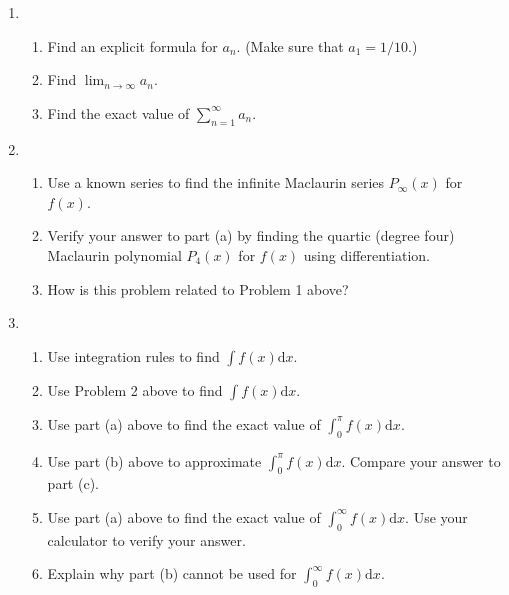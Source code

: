 \documentclass[12pt]{article}
\begin{document}
\begin{enumerate}
  
\item  

\begin{enumerate}

\item Find an explicit formula for $a_n$.  (Make sure that $a_1=1/10$.)




\item Find $\lim_{n \rightarrow \infty} a_n$.



\item Find the exact value of $\sum_{n=1}^{\infty} a_n$.



\end{enumerate}


\item  

\begin{enumerate}

\item Use a known series to find the infinite Maclaurin series $P_{\infty}(x)$ for $f(x)$.



\item Verify your answer to part (a) by finding the quartic (degree four) Maclaurin polynomial $P_{4}(x)$ for $f(x)$ using differentiation.

\item How is this problem related to Problem 1 above?


\end{enumerate}

\item  


\begin{enumerate}

\item Use integration rules to find ${\displaystyle \int f(x) \mathrm{d} x}.$

\item Use Problem 2 above to find ${\displaystyle \int f(x) \mathrm{d} x}.$


\item Use part (a) above to find the exact value of ${\displaystyle \int_0^{\pi} f(x) \mathrm{d} x}.$

\item Use part (b) above to approximate ${\displaystyle \int_0^{\pi} f(x) \mathrm{d} x}.$  Compare your answer to part (c).

\item Use part (a) above to find the exact value of ${\displaystyle \int_0^{\infty} f(x) \mathrm{d} x}.$  Use your calculator to verify your answer.

\item Explain why part (b) cannot be used for ${\displaystyle \int_0^{\infty} f(x) \mathrm{d} x}.$



\end{enumerate}
       
\end{enumerate}
\end{document}
